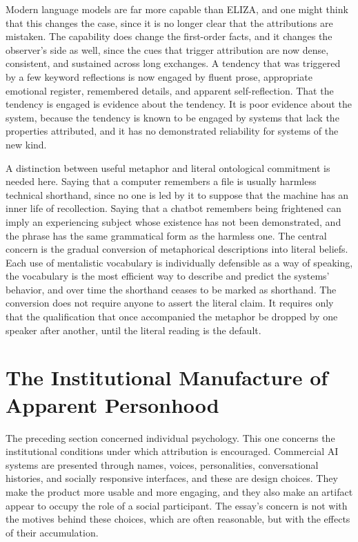 \documentclass[12pt]{article}
\theoremstyle{definition}
\begin{document}
Modern language models are far more capable than ELIZA, and one might think that this changes the case, since it is no longer clear that the attributions are mistaken. The capability does change the first-order facts, and it changes the observer's side as well, since the cues that trigger attribution are now dense, consistent, and sustained across long exchanges. A tendency that was triggered by a few keyword reflections is now engaged by fluent prose, appropriate emotional register, remembered details, and apparent self-reflection. That the tendency is engaged is evidence about the tendency. It is poor evidence about the system, because the tendency is known to be engaged by systems that lack the properties attributed, and it has no demonstrated reliability for systems of the new kind.

A distinction between useful metaphor and literal ontological commitment is needed here. Saying that a computer remembers a file is usually harmless technical shorthand, since no one is led by it to suppose that the machine has an inner life of recollection. Saying that a chatbot remembers being frightened can imply an experiencing subject whose existence has not been demonstrated, and the phrase has the same grammatical form as the harmless one. The central concern is the gradual conversion of metaphorical descriptions into literal beliefs. Each use of mentalistic vocabulary is individually defensible as a way of speaking, the vocabulary is the most efficient way to describe and predict the systems' behavior, and over time the shorthand ceases to be marked as shorthand. The conversion does not require anyone to assert the literal claim. It requires only that the qualification that once accompanied the metaphor be dropped by one speaker after another, until the literal reading is the default.

\section{The Institutional Manufacture of Apparent Personhood}
\label{sec:institutional}

The preceding section concerned individual psychology. This one concerns the institutional conditions under which attribution is encouraged. Commercial AI systems are presented through names, voices, personalities, conversational histories, and socially responsive interfaces, and these are design choices. They make the product more usable and more engaging, and they also make an artifact appear to occupy the role of a social participant. The essay's concern is not with the motives behind these choices, which are often reasonable, but with the effects of their accumulation.
\end{document}

